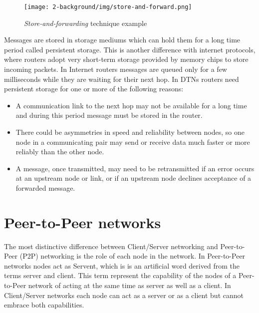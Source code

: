 \begin{figure}[htpb]
  \begin{center}
    \texttt{[image: 2-background/img/store-and-forward.png]}
    \caption{\textit{Store-and-forwarding} technique example}    
    \label{fig:store-carry-forward}
  \end{center}
\end{figure}

Messages are stored in storage mediums which can hold them for a long time period called persistent storage. This is another difference with internet protocols, where routers adopt very short-term storage provided by memory chips to store incoming packets. In Internet routers messages are queued only for a few milliseconds while they are waiting for their next hop. In DTNs routers need persistent storage for one or more of the following reasons:
\begin{itemize}
\item A communication link to the next hop may not be available for a long time and during this period message must be stored in the router.
\item There could be asymmetries in speed and reliability between nodes, so one node in a communicating pair may send or receive data much faster or more reliably than the other node.
\item A message, once transmitted, may need to be retransmitted if an error occurs at an upstream node or link, or if an upstream node declines acceptance of a forwarded message.
\end{itemize}


 
\section{Peer-to-Peer networks}
The most distinctive difference between Client/Server networking and Peer-to-Peer (P2P) networking is the role of each node in the network. In Peer-to-Peer networks nodes act as Servent, which is is an artificial word derived from the terms server and client. This term represent the capability of the nodes of a Peer-to-Peer network of acting at the same time as server as well as a client. In Client/Server networks each node can act as a server or as a client but cannot embrace both capabilities.
\\

